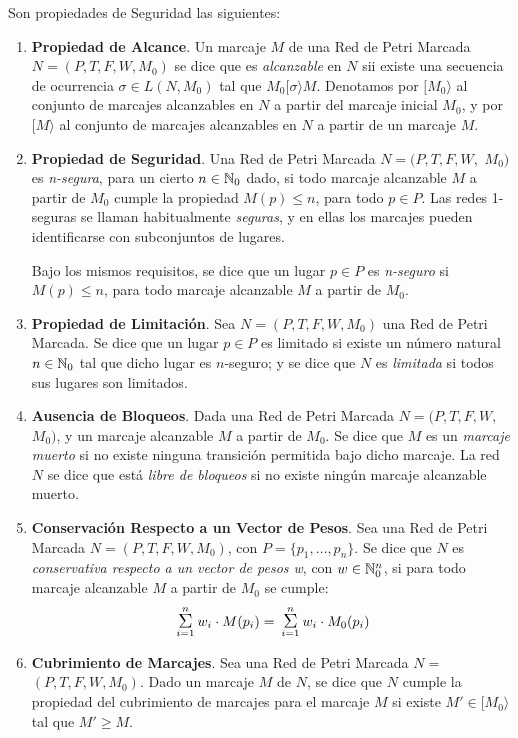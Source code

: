 Son propiedades de Seguridad las
siguientes:
\begin{enumerate}
\item {\bf Propiedad de Alcance}. Un marcaje $M$ de una Red de Petri
Marcada $N= (P,T,F,W,M_0)$ se dice que es {\it alcanzable} en $N$
sii existe una secuencia de ocurrencia $\sigma \in L(N,M_0)$
tal que $M_0 [ \sigma \rangle M$. Denotamos por $[M_0\rangle$ al
conjunto de marcajes alcanzables en $N$ a partir del marcaje
inicial $M_0$, y por $[ M \rangle$ al conjunto de marcajes alcanzables
en $N$ a partir de un marcaje $M$.
\item {\bf Propiedad de Seguridad}. Una Red de Petri Marcada
$N=(P,T,F,W,$ \linebreak
$M_0)$ es {\it n-segura}, para un cierto $n \in \mathbb{N}_{0}$ dado, si todo
marcaje alcanzable $M$ a partir de $M_0$ cumple la
propiedad $M(p) \leq n$, para todo $p \in P$. Las redes
1-seguras se llaman habitualmente {\it seguras}, y en ellas los
marcajes pueden identificarse con subconjuntos de lugares.

Bajo los mismos requisitos, se dice que un lugar $p \in P$ es
{\it n-seguro} si $M(p) \leq n$, para todo marcaje alcanzable
$M$ a partir de $M_0$.
\item {\bf Propiedad de Limitaci\'{o}n}. Sea
$N=(P,T,F,W,M_0)$ una Red de Petri Marcada.
Se dice que un lugar $p \in P$ es limitado si
existe un n\'{u}mero natural $n \in \mathbb{N}_{0}$ tal que dicho lugar es
$n$-seguro; y se dice que $N$ es {\it limitada} si todos sus lugares
son limitados.
\item {\bf Ausencia de Bloqueos}. Dada una Red de Petri Marcada
$N=(P,T,F,W,$ \linebreak
$M_0)$, y un marcaje alcanzable $M$ a partir de $M_0$.
Se dice que $M$ es un {\it marcaje muerto} si no existe ninguna
transici\'{o}n permitida bajo dicho marcaje. La red $N$ se dice
que est\'{a} {\it libre de bloqueos} si no existe ning\'{u}n marcaje
alcanzable muerto.
\item {\bf Conservaci\'{o}n Respecto a un Vector de Pesos}.
Sea una Red de Petri Marcada $N=(P,T,F,W,M_0)$, con
$P = \{p_1,\ldots,p_n\}$. Se dice que $N$ es
{\it conservativa respecto a un vector de pesos w}, con
$w \in \mathbb{N}_{0}^n$, si para todo marcaje alcanzable $M$
a partir de $M_0$ se cumple:
\[ \suma{i=1}{n} w_i \cdot M(p_i) =
\suma{i=1}{n} w_i \cdot M_0(p_i)\]
\item {\bf Cubrimiento de Marcajes}.
Sea una Red de Petri Mar\-cada $N=$ \linebreak $(P,T,F,W,
M_0)$. Dado un marcaje $M$ de $N$, se dice que $N$ cumple la propiedad
del cubrimiento de marcajes para el marcaje $M$ si existe $M' \in
[M_0 \rangle$ tal que $M' \geq M$.
\end{enumerate}


